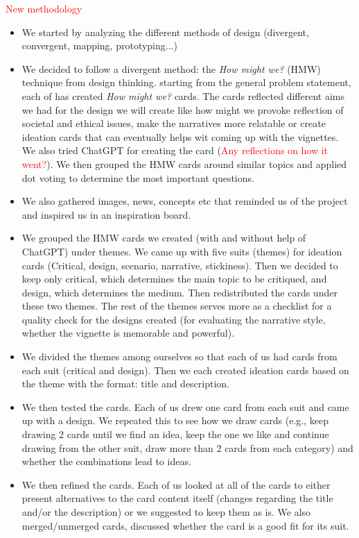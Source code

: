 \textcolor{red}{New methodology}
\begin{itemize}
	\item We started by analyzing the different methods of design (divergent, convergent, mapping, prototyping...)
	\item We decided to follow a divergent method:  the \textit{How might we?} (HMW) technique from design thinking. starting from the general problem statement, each of has created \textit{How might we?} cards. The cards reflected different aims we had for the design we will create like how might we provoke reflection of societal and ethical issues, make the narratives more relatable or create ideation cards that can eventually helps wit coming up with the vignettes. We also tried ChatGPT for creating the card (\textcolor{red}{Any reflections on how it went?}). We then grouped the HMW cards around similar topics and applied dot voting to determine the most important questions.
	\item We also gathered images, news, concepts etc that reminded us of the project and inspired us in an inspiration board.
	\item We grouped the HMW cards we created (with and without help of ChatGPT) under themes. We came up with five suits (themes) for ideation cards (Critical, design, scenario, narrative, stickiness). Then we decided to keep only critical, which determines the main topic to be critiqued, and design, which determines the medium. Then redistributed the cards under these two themes. The rest of the themes serves more as a checklist for a quality check for the designs created (for evaluating the narrative style, whether the vignette is memorable and powerful).
	\item We divided the themes among ourselves so that each of us had cards from each suit (critical and design). Then we each created ideation cards based on the theme with the format: title and description.
	\item We then tested the cards. Each of us drew one card from each suit and came up with a design. We repeated this to see how we draw cards (e.g., keep drawing 2 cards until we find an idea, keep the one we like and continue drawing from the other suit, draw more than 2 cards from each category) and whether the combinations lead to ideas.
	\item We then refined the cards. Each of us looked at all of the cards to either present alternatives to the card content itself (changes regarding the title and/or the description) or we suggested to keep them as is. We also merged/unmerged cards, discussed whether the card is a good fit for its suit. 

\end{itemize}
